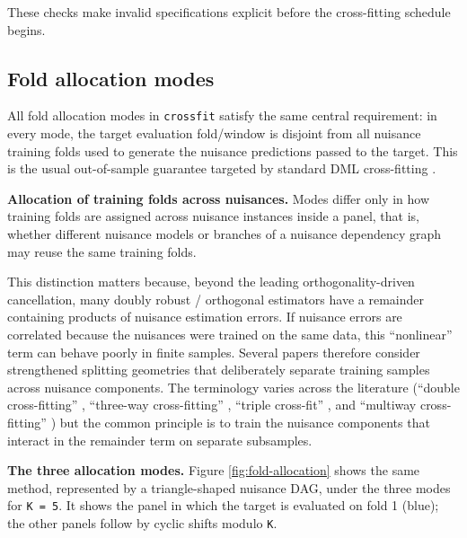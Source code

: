 These checks make invalid specifications explicit before the cross-fitting schedule begins.

\subsection{Fold allocation modes}\label{subsec:allocation}

All fold allocation modes in \texttt{crossfit} satisfy the same central requirement: in every mode, the target evaluation fold/window is disjoint from all nuisance training folds used to generate the nuisance predictions passed to the target. This is the usual out-of-sample guarantee targeted by standard DML cross-fitting \citep{chernozhukov2018, newey2018}.

\textbf{Allocation of training folds across nuisances.} Modes differ only in how training folds are assigned across nuisance instances inside a panel, that is, whether different nuisance models or branches of a nuisance dependency graph may reuse the same training folds.

This distinction matters because, beyond the leading orthogonality-driven cancellation, many doubly robust / orthogonal estimators have a remainder containing products of nuisance estimation errors. If nuisance errors are correlated because the nuisances were trained on the same data, this ``nonlinear'' term can behave poorly in finite samples. Several papers therefore consider strengthened splitting geometries that deliberately separate training samples across nuisance components. The terminology varies across the literature (``double cross-fitting'' \citep{newey2018, mcclean2024}, ``three-way cross-fitting'' \citep{fisher2023}, ``triple cross-fit'' \citep{ke2024}, and ``multiway cross-fitting'' \citep{chiang2022}) but the common principle is to train the nuisance components that interact in the remainder term on separate subsamples.

\textbf{The three allocation modes.} Figure \ref{fig:fold-allocation} shows the same method, represented by a triangle-shaped nuisance DAG, under the three modes for \texttt{K\ =\ 5}. It shows the panel in which the target is evaluated on fold 1 (blue); the other panels follow by cyclic shifts modulo \texttt{K}.

